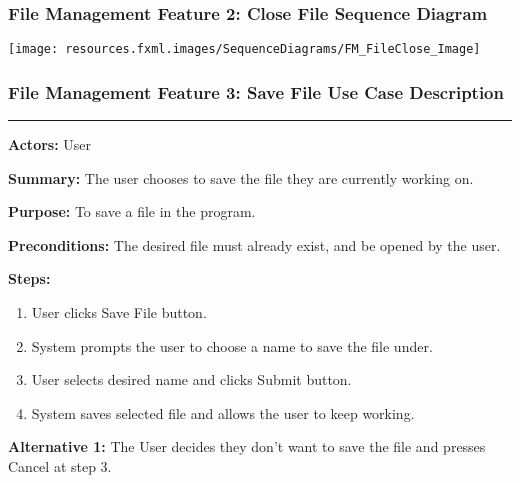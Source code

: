 \documentclass[twoside,letterpaper]{article}
\begin{document}
\newpage

\subsubsection[File Management Feature 2: Close File Sequence Diagram]{\rmfamily\bfseries\color{black}
	File Management Feature 2: Close File Sequence Diagram}
\hypertarget{RefHeading22059017292}{}

\texttt{[image: resources.fxml.images/SequenceDiagrams/FM\_FileClose\_Image]}

\newpage

\subsubsection[File Management Feature 3: Save File Use Case Description]{\rmfamily\bfseries\color{black}
	File Management Feature 3: Save File Use Case Description}
\hypertarget{RefHeading22059017292}{}

\vspace{2pt}
\hrule
\vspace{8pt}
\textbf{Actors:} User \newline

\noindent\textbf{Summary:} The user chooses to save the file they are currently working on. \newline

\noindent\textbf{Purpose:} To save a file in the program. \newline

\noindent\textbf{Preconditions:} The desired file must already exist, and be opened by the user. \newline

\noindent\textbf{Steps:} \begin{enumerate}
	\item User clicks Save File button.
	\item System prompts the user to choose a name to save the file under.
	\item User selects desired name and clicks Submit button.
	\item System saves selected file and allows the user to keep working.

\end{enumerate}
\noindent\textbf{Alternative 1:} The User decides they don't want to save the file and presses Cancel at step 3. \newline
\end{document}
